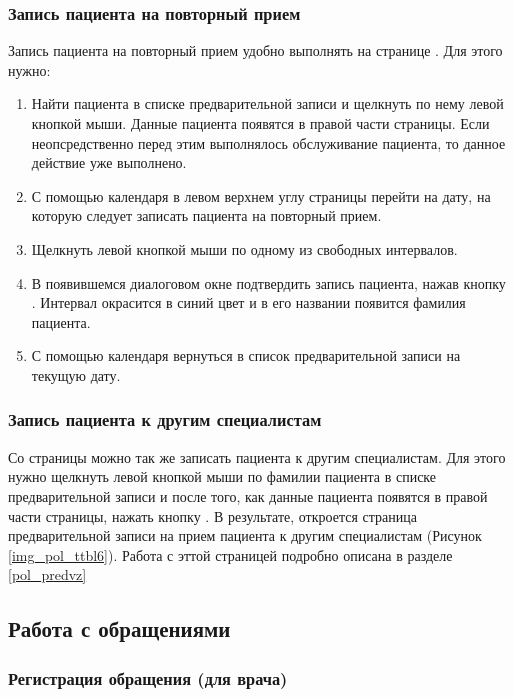\subsubsection{Запись пациента на повторный прием} 

Запись пациента на повторный прием удобно выполнять на странице . Для этого нужно:
\begin{enumerate}
	\item Найти пациента в списке предварительной записи и щелкнуть по нему левой кнопкой мыши. Данные пациента появятся в правой части страницы. Если неопсредственно перед этим выполнялось обслуживание пациента, то данное действие уже выполнено.
	\item С помощью календаря в левом верхнем углу страницы перейти на дату, на которую следует записать пациента на повторный прием.
	\item Щелкнуть левой кнопкой мыши по одному из свободных интервалов.
	\item В появившемся диалоговом окне подтвердить запись пациента, нажав кнопку . Интервал окрасится в синий цвет и в его названии появится фамилия пациента.
	\item С помощью календаря вернуться в список предварительной записи на текущую дату.
\end{enumerate} 

\subsubsection{Запись пациента к другим специалистам}

Со страницы  можно так же записать пациента к другим специалистам. Для этого нужно щелкнуть левой кнопкой мыши по фамилии пациента в списке предварительной записи и после того, как данные пациента появятся в правой части страницы, нажать кнопку . В результате, откроется страница предварительной записи на прием пациента к другим специалистам (Рисунок \ref{img_pol_ttbl6}). Работа с эттой страницей подробно описана в разделе \ref{pol_predvz}

\subsection{Работа с обращениями}
\subsubsection{Регистрация обращения (для врача)}

